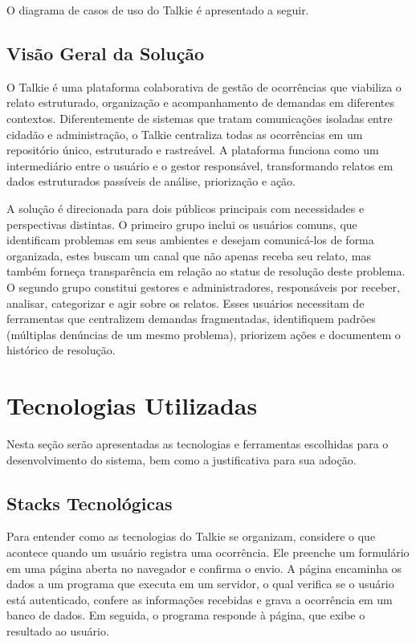 \documentclass[12pt,a4paper]{article}
\begin{document}
O diagrama de casos de uso do Talkie é apresentado a seguir.


\subsection{Visão Geral da Solução}
O Talkie é uma plataforma colaborativa de gestão de ocorrências que viabiliza o relato estruturado, organização e acompanhamento de demandas em diferentes contextos. Diferentemente de sistemas que tratam comunicações isoladas entre cidadão e administração, o Talkie centraliza todas as ocorrências em um repositório único, estruturado e rastreável. A plataforma funciona como um intermediário entre o usuário e o gestor responsável, transformando relatos em dados estruturados passíveis de análise, priorização e ação.

A solução é direcionada para dois públicos principais com necessidades e perspectivas distintas. O primeiro grupo inclui os usuários comuns, que identificam problemas em seus ambientes e desejam comunicá-los de forma organizada, estes buscam um canal que não apenas receba seu relato, mas também forneça transparência em relação ao status de resolução deste problema. O segundo grupo constitui gestores e administradores, responsáveis por receber, analisar, categorizar e agir sobre os relatos. Esses usuários necessitam de ferramentas que centralizem demandas fragmentadas, identifiquem padrões (múltiplas denúncias de um mesmo problema), priorizem ações e documentem o histórico de resolução.


\section{Tecnologias Utilizadas}
Nesta seção serão apresentadas as tecnologias e ferramentas escolhidas para o
desenvolvimento do sistema, bem como a justificativa para sua adoção.

\subsection{Stacks Tecnológicas}
Para entender como as tecnologias do Talkie se organizam, considere o que acontece quando um usuário registra uma ocorrência. Ele preenche um formulário em uma página aberta no navegador e confirma o envio. A página encaminha os dados a um programa que executa em um servidor, o qual verifica se o usuário está autenticado, confere as informações recebidas e grava a ocorrência em um banco de dados. Em seguida, o programa responde à página, que exibe o resultado ao usuário.
\end{document}
